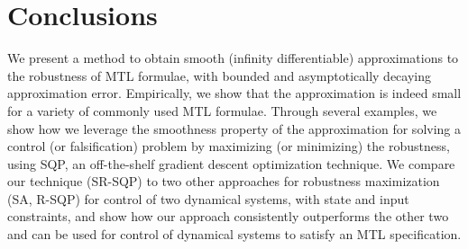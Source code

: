 \section{Conclusions}
We present a method to obtain smooth (infinity differentiable) approximations to the robustness of MTL formulae, with bounded and asymptotically decaying approximation error. 
Empirically, we show that the approximation is indeed small for a variety of commonly used MTL formulae. 
Through several examples, we show how we leverage the smoothness property of the approximation for solving a control (or falsification) problem by maximizing (or minimizing) the robustness, using SQP, an off-the-shelf gradient descent optimization technique. 
We compare our technique (SR-SQP) to two other approaches for robustness maximization (SA, R-SQP) for control of two dynamical systems, with state and input constraints, and show how our approach consistently outperforms the other two and can be used for control of dynamical systems to satisfy an MTL specification.

